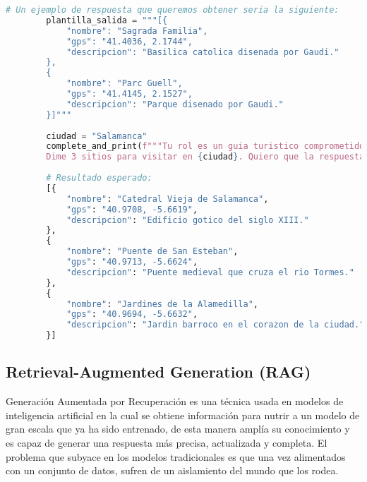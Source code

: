 	\begin{lstlisting}[language=Python, caption={Ejemplo de uso de \textit{few-shot} y \textit{tool-calling} para obtener puntos de interés turísticos}]
		# Un ejemplo de respuesta que queremos obtener seria la siguiente:
		plantilla_salida = """[{
			"nombre": "Sagrada Familia", 
			"gps": "41.4036, 2.1744", 
			"descripcion": "Basilica catolica disenada por Gaudi." 
		},
		{
			"nombre": "Parc Guell", 
			"gps": "41.4145, 2.1527", 
			"descripcion": "Parque disenado por Gaudi."
		}]"""
		
		ciudad = "Salamanca"
		complete_and_print(f"""Tu rol es un guia turistico comprometido con el medio ambiente preocupado por la gentrificacion de las ciudades y el turismo masivo. 
		Dime 3 sitios para visitar en {ciudad}. Quiero que la respuesta consista SOLO en los lugares de interes de este lugar, siguiendo el ejemplo de la {plantilla_salida}. Insisto en que no quiero que me des informacion adicional.""")
		
		# Resultado esperado:
		[{
			"nombre": "Catedral Vieja de Salamanca", 
			"gps": "40.9708, -5.6619", 
			"descripcion": "Edificio gotico del siglo XIII."
		},
		{
			"nombre": "Puente de San Esteban", 
			"gps": "40.9713, -5.6624", 
			"descripcion": "Puente medieval que cruza el rio Tormes."
		},
		{
			"nombre": "Jardines de la Alamedilla", 
			"gps": "40.9694, -5.6632", 
			"descripcion": "Jardin barroco en el corazon de la ciudad."
		}]
	\end{lstlisting}
	
	\subsection{Retrieval-Augmented Generation (RAG)}
	Generación Aumentada por Recuperación es una técnica usada en modelos de inteligencia artificial en la cual se obtiene información para nutrir a un modelo de gran escala que ya ha sido entrenado, de esta manera amplía su conocimiento y es capaz de generar una respuesta más precisa, actualizada y completa. 
	El problema que subyace en los modelos tradicionales es que una vez alimentados con un conjunto de datos, sufren de un aislamiento del mundo que los rodea.
	
